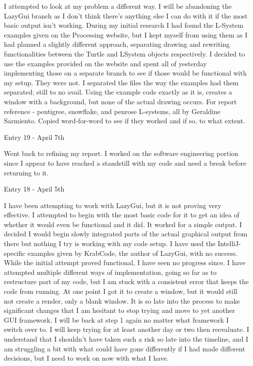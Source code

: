 \documentclass[]{final_report}
\begin{document}
I attempted to look at my problem a different way. I will be abandoning the LazyGui branch as I don't think there's anything else I can do with it if the most basic output isn't working. During my initial research I had found the L-System examples given on the Processing website, but I kept myself from using them as I had planned a slightly different approach, separating drawing and rewriting functionalities between the Turtle and LSystem objects respectively. I decided to use the examples provided on the website and spent all of yesterday implementing those on a separate branch to see if those would be functional with my setup. They were not. I separated the files the way the examples had them separated; still to no avail. Using the example code exactly as it is, creates a window with a background, but none of the actual drawing occurs.
For report reference - pentigree, snowflake, and penrose L-systems, all by Geraldine Sarmiento. Copied word-for-word to see if they worked and if so, to what extent.

Entry 19 - April 7th

Went back to refining my report. I worked on the software engineering portion since I appear to have reached a standstill with my code and need a break before returning to it.

Entry 18 - April 5th

I have been attempting to work with LazyGui, but it is not proving very effective. I attempted to begin with the most basic code for it to get an idea of whether it would even be functional and it did. It worked for a simple output. I decided I would begin slowly integrated parts of the actual graphical output from there but nothing I try is working with my code setup. I have used the IntelliJ-specific examples given by KrabCode, the author of LazyGui, with no success. While the initial attempt proved functional, I have seen no progress since. I have attempted multiple different ways of implementation, going so far as to restructure part of my code, but I am stuck with a consistent error that keeps the code from running. At one point I got it to create a window, but it would still not create a render, only a blank window. It is so late into the process to make significant changes that I am hesitant to stop trying and move to yet another GUI framework. I will be back at step 1 again no matter what framework I switch over to. I will keep trying for at least another day or two then reevaluate. I understand that I shouldn't have taken such a risk so late into the timeline, and I am struggling a bit with what could have gone differently if I had made different decisions, but I need to work on now with what I have.
\end{document}
